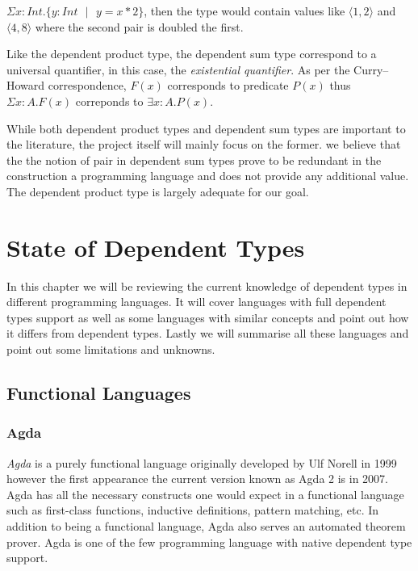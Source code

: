 \documentclass[a4paper,12pt]{report}
\begin{document}
$\Sigma x: Int.\{y:Int\text{ }|\text{ } y = x * 2\}$, then the type would 
contain values like $\langle 1,2 \rangle$ and $\langle 4,8 \rangle$ where the 
second pair is doubled the first.

\par
Like the dependent product type, the dependent sum type correspond to a 
universal quantifier, in this case, the \textit{existential quantifier}. As 
per the Curry–Howard correspondence, $F(x)$ corresponds to predicate $P(x)$ 
thus $\Sigma x:A.F(x)$ correponds to $\exists x: A. P(x)$.

\par
While both dependent product types and dependent sum types are important to the 
literature, the project itself will mainly focus on the former. we believe that 
the the notion of pair in dependent sum types prove to be redundant in 
the construction a programming language and does not provide any additional 
value. The dependent product type is largely adequate for our goal.

\chapter{State of Dependent Types} 
In this chapter we will be reviewing the current knowledge of dependent types 
in different programming languages. It will cover languages with full dependent 
types support as well as some languages with similar concepts and point out how 
it differs from dependent types. Lastly we will summarise all these languages 
and point out some limitations and unknowns. 

\section{Functional Languages}

\subsection{Agda}

\textit{Agda} is a purely functional language originally developed by Ulf Norell in 
1999 however the first appearance the current version known as Agda 2 is in 
2007. Agda has all the necessary constructs one would expect in a functional 
language such as first-class functions, inductive definitions, pattern matching, 
etc. In addition to being a functional language, Agda also serves an automated theorem prover. 
Agda is one of the few programming language with native dependent type support. 
\end{document}
